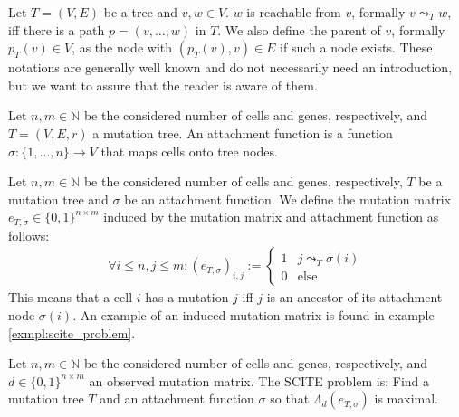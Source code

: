 \begin{definition}
    \label{def:reachability}
    Let $T = (V, E)$ be a tree and $v, w \in V$. $w$ is reachable from $v$, formally $v \leadsto_T w$, iff there is a path $p = (v, \dots, w)$ in $T$. We also define the parent of $v$, formally $p_T(v) \in V$, as the node with $(p_T(v), v) \in E$ if such a node exists. These notations are generally well known and do not necessarily need an introduction, but we want to assure that the reader is aware of them.
\end{definition}

\begin{definition}
    \label{def:attachment}
    Let $n, m \in \mathbb{N}$ be the considered number of cells and genes, respectively, and $T = (V, E, r)$ a mutation tree. An attachment function is a function $\sigma: \{1, \dots, n\} \rightarrow V$ that maps cells onto tree nodes.
\end{definition}

\begin{definition}
    \label{def:induced_mutmatrix}
    Let $n, m \in \mathbb{N}$ be the considered number of cells and genes, respectively, $T$ be a mutation tree and $\sigma$ be an attachment function. We define the mutation matrix $e_{T, \sigma} \in \{0,1\}^{n \times m}$ induced by the mutation matrix and attachment function as follows:
    \begin{align*}
        \forall i \leq n, j \leq m: (e_{T, \sigma})_{i,j} := \begin{cases}
            1 & j \leadsto_T \sigma(i) \\
            0 & \mathrm{else}
        \end{cases}
    \end{align*}
    This means that a cell $i$ has a mutation $j$ iff $j$ is an ancestor of its attachment node $\sigma(i)$. An example of an induced mutation matrix is found in example \ref{exmpl:scite_problem}.
\end{definition}

\begin{definition}
    \label{def:scite_problem}
    Let $n, m \in \mathbb{N}$ be the considered number of cells and genes, respectively, and $d \in \{0,1\}^{n \times m}$ an observed mutation matrix. The \ac{SCITE} problem is: Find a mutation tree $T$ and an attachment function $\sigma$ so that $\Lambda_d(e_{T, \sigma})$ is maximal.
\end{definition}

